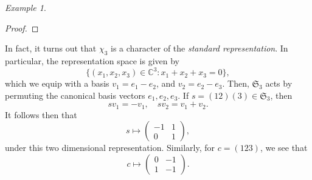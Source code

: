 \documentclass[a4paper]{report}
\theoremstyle{definition}
\theoremstyle{remark}
\theoremstyle{proposition}
\theoremstyle{conjecture}
\theoremstyle{lemma}
\theoremstyle{corollary}
\theoremstyle{exercise}
\theoremstyle{example}
\newtheorem{example}{Example}
\newcommand{\C}{\mathbb{C}}
\begin{document}
\begin{example}
\begin{proof}
    \end{proof}
    In fact, it turns out that $\chi_3$ is a character of the \emph{standard
    representation}. In particular,
    the representation space is given by
    $$\lbrace (x_1,x_2,x_3) \in \C^3 : x_1+x_2+x_3 = 0\rbrace,$$
    which we equip with a basis $v_1 = e_1-e_2$, and $v_2 = e_2-e_3$.
    Then, $\mathfrak{S}_3$ acts by permuting the canonical basis vectors 
    $e_1,e_2,e_3$.
    If $s = (12)(3)\in\mathfrak{S}_3$, then 
    $$sv_1 = -v_1,\quad sv_2 = v_1+v_2.$$
    It follows then that 
    $$s\longmapsto \begin{pmatrix}
        -1&1\\
        0&1
    \end{pmatrix},$$
    under this two dimensional representation. Similarly, for $c = (123)$, 
    we see that 
    $$c\longmapsto \begin{pmatrix}
        0&-1\\
        1&-1
    \end{pmatrix}.$$
\end{example}
\end{document}
